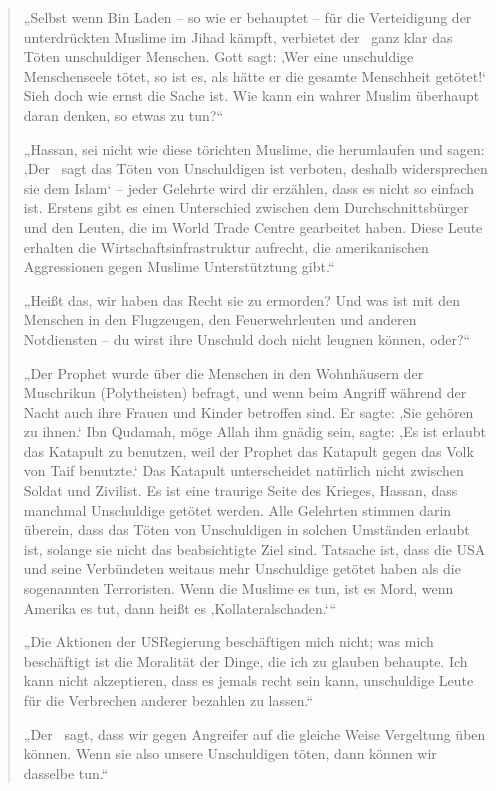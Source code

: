 \documentclass[12pt]{memoir}
\begin{document}
\begin{quote}
„Selbst wenn Bin Laden – so wie er behauptet –
für die Verteidigung der unterdrückten Muslime im Jihad kämpft,
verbietet der \Quran\ ganz klar das Töten unschuldiger Menschen.
Gott sagt: ‚Wer eine unschuldige Menschenseele tötet, so ist es,
als hätte er die gesamte Menschheit getötet!‘
Sieh doch wie ernst die Sache ist.
Wie kann ein wahrer Muslim überhaupt daran denken, so etwas zu tun?“

„Hassan, sei nicht wie diese törichten Muslime, die herumlaufen und sagen:
‚Der \Quran\ sagt das Töten von Unschuldigen ist verboten,
deshalb widersprechen sie dem Islam‘ –
jeder Gelehrte wird dir erzählen, dass es nicht so einfach ist.
Erstens gibt es einen Unterschied zwischen dem Durchschnittsbürger
und den Leuten, die im World Trade Centre gearbeitet haben.
Diese Leute erhalten die Wirtschaftsinfrastruktur aufrecht,
die amerikanischen Aggressionen gegen Muslime Unterstütztung gibt.“

„Heißt das, wir haben das Recht sie zu ermorden?
Und was ist mit den Menschen in den Flugzeugen,
den Feuerwehrleuten und anderen Notdiensten –
du wirst ihre Unschuld doch nicht leugnen können, oder?“

„Der Prophet wurde über die Menschen in den Wohnhäusern der Muschrikun
(Polytheisten) befragt, und wenn beim Angriff während der Nacht
auch ihre Frauen und Kinder betroffen sind.
Er sagte: ‚Sie gehören zu ihnen.‘
Ibn Qudamah, möge Allah ihm gnädig sein, sagte:
‚Es ist erlaubt das Katapult zu benutzen, weil der Prophet
das Katapult gegen das Volk von Ta\´if benutzte.‘
Das Katapult unterscheidet natürlich nicht zwischen Soldat und Zivilist.
Es ist eine traurige Seite des Krieges, Hassan,
dass manchmal Unschuldige getötet werden.
Alle Gelehrten stimmen darin überein,
dass das Töten von Unschuldigen
in solchen Umständen erlaubt ist,
solange sie nicht das beabsichtigte Ziel sind.
Tatsache ist, dass die USA und seine Verbündeten
weitaus mehr Unschuldige getötet haben als die sogenannten Terroristen.
Wenn die Muslime es tun, ist es Mord,
wenn Amerika es tut, dann heißt es ‚Kollateralschaden.‘“

„Die Aktionen der US\–Regierung beschäftigen mich nicht;
was mich beschäftigt ist die Moralität der Dinge, die ich zu glauben behaupte.
Ich kann nicht akzeptieren, dass es jemals recht sein kann,
unschuldige Leute für die Verbrechen anderer bezahlen zu lassen.“

„Der \Quran\ sagt, dass wir gegen Angreifer
auf die gleiche Weise Vergeltung üben können.
Wenn sie also unsere Unschuldigen töten, dann können wir dasselbe tun.“


\end{quote}
\end{document}
